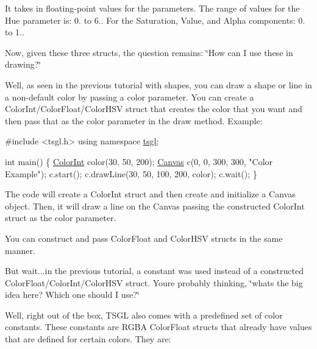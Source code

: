 It takes in floating-\/point values for the parameters. The range of values for the Hue parameter is\+: 0. to 6.. For the Saturation, Value, and Alpha components\+: 0. to 1..

Now, given these three structs, the question remains\+: \char`\"{}\+How can I use these in drawing?\char`\"{}

Well, as seen in the previous tutorial with shapes, you can draw a shape or line in a non-\/default color by passing a color parameter. You can create a Color\+Int/\+Color\+Float/\+Color\+H\+S\+V struct that creates the color that you want and then pass that as the color parameter in the draw method. Example\+:


\begin{DoxyCode}
\textcolor{preprocessor}{#include <tsgl.h>}
\textcolor{keyword}{using namespace }\hyperlink{namespacetsgl}{tsgl};

\textcolor{keywordtype}{int} main() \{
  \hyperlink{structtsgl_1_1_color_int}{ColorInt} color(30, 50, 200);
  \hyperlink{classtsgl_1_1_canvas}{Canvas} c(0, 0, 300, 300, \textcolor{stringliteral}{"Color Example"});
  c.start();
  c.drawLine(30, 50, 100, 200, color);
  c.wait();
\}
\end{DoxyCode}


The code will create a Color\+Int struct and then create and initialize a Canvas object. Then, it will draw a line on the Canvas passing the constructed Color\+Int struct as the color parameter.

You can construct and pass Color\+Float and Color\+H\+S\+V structs in the same manner.

But wait...in the previous tutorial, a constant was used instead of a constructed Color\+Float/\+Color\+Int/\+Color\+H\+S\+V struct. You\textquotesingle{}re probably thinking, \char`\"{}what\textquotesingle{}s the big idea here? Which one should I use?\char`\"{}

Well, right out of the box, T\+S\+G\+L also comes with a predefined set of color constants. These constants are R\+G\+B\+A Color\+Float structs that already have values that are defined for certain colors. They are\+:


